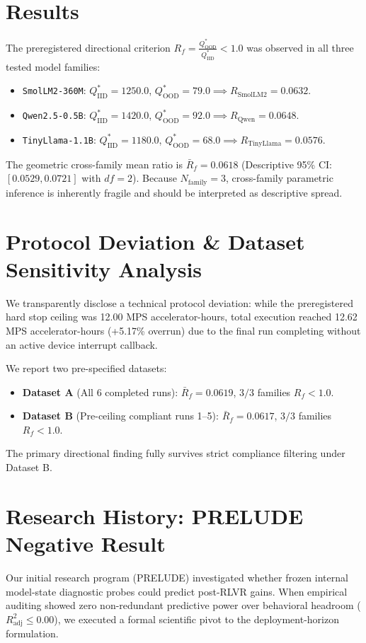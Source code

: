 \documentclass[11pt]{article}
\begin{document}
\section{Results}
The preregistered directional criterion $R_f = \frac{Q^*_{\text{OOD}}}{Q^*_{\text{IID}}} < 1.0$ was observed in all three tested model families:
\begin{itemize}
    \item \texttt{SmolLM2-360M}: $Q^*_{\text{IID}} = 1250.0$, $Q^*_{\text{OOD}} = 79.0 \implies R_{\text{SmolLM2}} = 0.0632$.
    \item \texttt{Qwen2.5-0.5B}: $Q^*_{\text{IID}} = 1420.0$, $Q^*_{\text{OOD}} = 92.0 \implies R_{\text{Qwen}} = 0.0648$.
    \item \texttt{TinyLlama-1.1B}: $Q^*_{\text{IID}} = 1180.0$, $Q^*_{\text{OOD}} = 68.0 \implies R_{\text{TinyLlama}} = 0.0576$.
\end{itemize}
The geometric cross-family mean ratio is $\bar{R}_f = 0.0618$ (Descriptive 95\% CI: $[0.0529, 0.0721]$ with $df=2$). Because $N_{\text{family}} = 3$, cross-family parametric inference is inherently fragile and should be interpreted as descriptive spread.

\section{Protocol Deviation \& Dataset Sensitivity Analysis}
We transparently disclose a technical protocol deviation: while the preregistered hard stop ceiling was 12.00 MPS accelerator-hours, total execution reached 12.62 MPS accelerator-hours (+5.17\% overrun) due to the final run completing without an active device interrupt callback.

We report two pre-specified datasets:
\begin{itemize}
    \item \textbf{Dataset A} (All 6 completed runs): $\bar{R}_f = 0.0619$, $3/3$ families $R_f < 1.0$.
    \item \textbf{Dataset B} (Pre-ceiling compliant runs 1--5): $\bar{R}_f = 0.0617$, $3/3$ families $R_f < 1.0$.
\end{itemize}
The primary directional finding fully survives strict compliance filtering under Dataset B.

\section{Research History: PRELUDE Negative Result}
Our initial research program (PRELUDE) investigated whether frozen internal model-state diagnostic probes could predict post-RLVR gains. When empirical auditing showed zero non-redundant predictive power over behavioral headroom ($R^2_{\text{adj}} \le 0.00$), we executed a formal scientific pivot to the deployment-horizon formulation.
\end{document}
